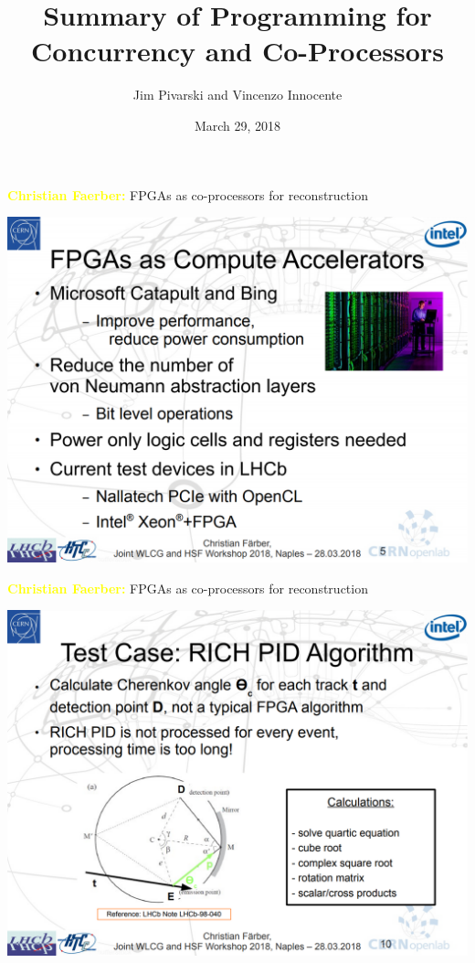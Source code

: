 \documentclass[aspectratio=169]{beamer}
\title[2018-03-29-concurrency-summary]{Summary of Programming for Concurrency and Co-Processors}
\author{Jim Pivarski and Vincenzo Innocente}
\date{March 29, 2018}
\begin{document}

\begin{frame}
  \titlepage
\end{frame}




\begin{frame}{\textcolor{yellow}{\bf Christian Faerber:} FPGAs as co-processors for reconstruction}
\vspace{0.13 cm}
\begin{center}
\includegraphics[width=0.73\linewidth]{fpgas-1.png}
\end{center}
\end{frame}

\begin{frame}{\textcolor{yellow}{\bf Christian Faerber:} FPGAs as co-processors for reconstruction}
\vspace{0.13 cm}
\begin{center}
\includegraphics[width=0.73\linewidth]{fpgas-2.png}
\end{center}
\end{frame}
\end{document}
